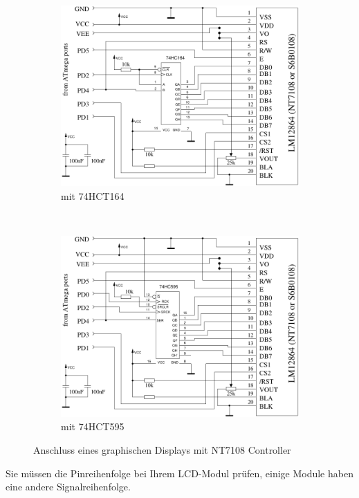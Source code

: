 \begin{figure}[H]
  \begin{subfigure}[b]{.5\textwidth}	%
    \centering
    \includegraphics[width=.9\textwidth]{../FIG/ST7108serial164.pdf}	%
    \caption{mit 74HCT164}
  \end{subfigure}
~
  \begin{subfigure}[b]{.5\textwidth}	%
    \centering
    \includegraphics[width=.9\textwidth]{../FIG/ST7108serial595.pdf}	%
    \caption{mit 74HCT595}
  \end{subfigure}
  \caption{Anschluss eines graphischen Displays mit NT7108 Controller}
\label{fig:NT7108lcd}
\end{figure}

Sie müssen die Pinreihenfolge bei Ihrem LCD-Modul prüfen, einige Module haben eine andere Signalreihenfolge.


